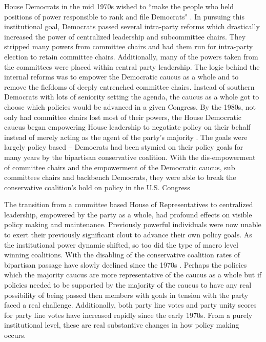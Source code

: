 \documentclass[12pt]{article}
\begin{document}
House Democrats in the mid 1970s wished to ``make the people who held positions of power responsible to rank and file Democrats" \citep[pg. 26, quote spoken by Rep. Donald Fraser (D-MN)]{rohde1991}. In pursuing this institutional goal, Democrats passed several intra-party reforms which drastically increased the power of centralized leadership and subcommittee chairs. They stripped many powers from committee chairs and had them run for intra-party election to retain committee chairs. Additionally, many of the powers taken from the committees were placed within central party leadership. The logic behind the internal reforms was to empower the Democratic caucus as a whole and to remove the fiefdoms of deeply entrenched committee chairs. Instead of southern Democrats with lots of seniority setting the agenda, the caucus as a whole got to choose which policies would be advanced in a given Congress. By the 1980s, not only had committee chairs lost most of their powers, the House Democratic caucus began empowering House leadership to negotiate policy on their behalf instead of merely acting as the agent of the party's majority \citep{sinclair1983, palazzolo1992, sinclair1998}. The goals were largely policy based -- Democrats had been stymied on their policy goals for many years by the bipartisan conservative coalition. With the dis-empowerment of committee chairs and the empowerment of the Democratic caucus, sub committees chairs and backbench Democrats, they were able to break the conservative coalition's hold on policy in the U.S. Congress

The transition from a committee based House of Representatives to centralized leadership, empowered by the party as a whole, had profound effects on visible policy making and maintenance. Previously powerful individuals were now unable to exert their previously significant clout to advance their own policy goals. As the institutional power dynamic shifted, so too did the type of macro level winning coalitions. With the disabling of the conservative coalition rates of bipartisan passage have slowly declined since the 1970s \cite{trubowitz2005}. Perhaps the policies which the majority caucus are more representative of the caucus as a whole but if policies needed to be supported by the majority of the caucus to have any real possibility of being passed then members with goals in tension with the party faced a real challenge. Additionally, both party line votes and party unity scores for party line votes have increased rapidly since the early 1970s. From a purely institutional level, these are real substantive changes in how policy making occurs. 
\end{document}
